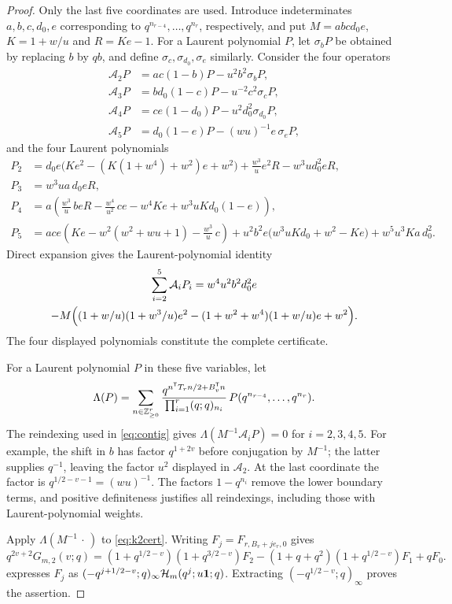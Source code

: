 \begin{proof}
Only the last five coordinates are used. Introduce indeterminates $a,b,c,d_0,e$ corresponding to $q^{n_{r-4}},\dots,q^{n_r}$, respectively, and put $M=abcd_0e$, $K=1+w/u$ and $R=Ke-1$. For a Laurent polynomial $P$, let $\sigma_bP$ be obtained by replacing $b$ by $qb$, and define $\sigma_c,\sigma_{d_0},\sigma_e$ similarly. Consider the four operators
\begin{align*}
\mathcal A_2P&=ac(1-b)P-u^2b^2\sigma_bP,\\
\mathcal A_3P&=bd_0(1-c)P-u^{-2}c^2\sigma_cP,\\
\mathcal A_4P&=ce(1-d_0)P-u^2d_0^2\sigma_{d_0}P,\\
\mathcal A_5P&=d_0(1-e)P-(wu)^{-1}e\,\sigma_eP,
\end{align*}
and the four Laurent polynomials
\begin{align*}
P_2&=d_0e\bigl(Ke^2-(K(1+w^4)+w^2)e+w^2\bigr)+\frac{w^3}ue^2R-w^3ud_0^2eR,\\
P_3&=w^3ua\,d_0eR,\\
P_4&=a\left(\frac{w^3}u\,beR-\frac{w^4}{u^2}\,ce-w^4Ke+w^3uKd_0(1-e)\right),\\
P_5&=ace\left(Ke-w^2(w^2+wu+1)-\frac{w^3}u\,c\right)+u^2b^2e\bigl(w^3uKd_0+w^2-Ke\bigr)+w^5u^3Ka\,d_0^2.
\end{align*}
Direct expansion gives the Laurent-polynomial identity
\begin{multline}\label{eq:k2cert}
\sum_{i=2}^5\mathcal A_iP_i=w^4u^2b^2d_0^2e\\
-M\Bigl((1+w/u)(1+w^3/u)e^2-(1+w^2+w^4)(1+w/u)e+w^2\Bigr).
\end{multline}
The four displayed polynomials constitute the complete certificate.

For a Laurent polynomial $P$ in these five variables, let
\[
\Lambda(P)=\sum_{n\in\mathbb{Z}_{\ge0}^r}\frac{q^{n^{\mathsf{T}} T_rn/2+B_v^{\mathsf{T}} n}}{\prod_{i=1}^r(q;q)_{n_i}}\,P(q^{n_{r-4}},\dots,q^{n_r}).
\]
The reindexing used in \eqref{eq:contig} gives $\Lambda(M^{-1}\mathcal A_iP)=0$ for $i=2,3,4,5$. For example, the shift in $b$ has factor $q^{1+2v}$ before conjugation by $M^{-1}$; the latter supplies $q^{-1}$, leaving the factor $u^2$ displayed in $\mathcal A_2$. At the last coordinate the factor is $q^{1/2-v-1}=(wu)^{-1}$. The factors $1-q^{n_i}$ remove the lower boundary terms, and positive definiteness justifies all reindexings, including those with Laurent-polynomial weights.

Apply $\Lambda(M^{-1}\,\cdot\,)$ to \eqref{eq:k2cert}. Writing $F_j=F_{r,B_v+je_r,0}$ gives
\[
q^{2v+2}G_{m,2}(v;q)=(1+q^{1/2-v})(1+q^{3/2-v})F_2-(1+q+q^2)(1+q^{1/2-v})F_1+qF_0.
\]
 expresses $F_j$ as $(-q^{j+1/2-v};q)_\infty\mathcal{H}_m(q^j;u\mathbf{1};q)$. Extracting $(-q^{1/2-v};q)_\infty$ proves the assertion.
\end{proof}

